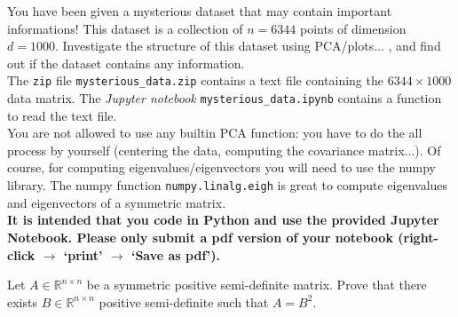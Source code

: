 \documentclass[11pt,nocut]{article}
\begin{document}
\begin{problem}[3 points]
	You have been given a mysterious dataset that may contain important informations! This dataset is a collection of $n=6344$ points of dimension $d=1000$.
	Investigate the structure of this dataset using PCA/plots... , and find out if the dataset contains any information.
	\\

	The \texttt{zip} file \texttt{mysterious\_data.zip} contains a text file containing the $6344\times 1000$ data matrix.
	The \emph{Jupyter notebook} \texttt{mysterious\_data.ipynb} contains a function to read the text file.
\\

	You are not allowed to use any builtin PCA function: you have to do the all process by yourself (centering the data, computing the covariance matrix...). Of course, for computing eigenvalues/eigenvectors you will need to use the numpy library.
	The numpy function \texttt{numpy.linalg.eigh} is great to compute eigenvalues and eigenvectors of a symmetric matrix. 
	\\

	\textbf{It is intended that you code in Python and use the provided Jupyter Notebook. Please only submit a pdf version of your notebook (right-click $\to$ `print' $\to$ `Save as pdf').}
\end{problem}


\vspace{5mm}

\begin{problem}[$\star$]
	Let $A \in \mathbb{R}^{n \times n}$ be a symmetric positive semi-definite matrix. Prove that there exists $B \in \mathbb{R}^{n \times n}$ positive  semi-definite such that $A = B^2$.
\end{problem}



%
%
\end{document}
